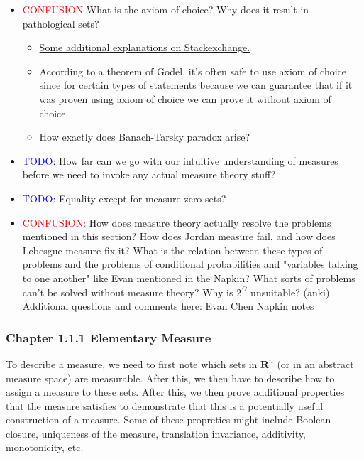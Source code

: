 \documentclass[answers,12pt]{exam}
\begin{document}
\begin{itemize}
    \item \textcolor{red}{CONFUSION} What is the axiom of choice? 
    Why does it result in pathological sets?
    \begin{itemize}
        \item \href{https://math.stackexchange.com/questions/132007/why-is-the-axiom-of-choice-separated-from-the-other-axioms}{Some additional explanations on Stackexchange.}
        \item According to a theorem of Godel, it's often safe to use axiom of choice since for certain types of statements because we can guarantee that if it was proven using axiom of choice we can prove it without axiom of choice.
        \item How exactly does Banach-Tarsky paradox arise?
    \end{itemize}
    \item \textcolor{blue}{TODO:} How far can we go with our intuitive understanding of measures before we need to invoke any actual measure theory stuff? 
    \item \textcolor{blue}{TODO:} Equality except for measure zero sets?
    \item \textcolor{red}{CONFUSION:} How does measure theory actually resolve the problems mentioned in this section? 
    How does Jordan measure fail, and how does Lebesgue measure fix it? 
    What is the relation between these types of problems and the problems of conditional probabilities and "variables talking to one another" like Evan mentioned in the Napkin? 
    What sorts of problems can't be solved without measure theory?
    Why is $2^{\Omega}$ unsuitable? (anki)
    Additional questions and comments here: \href{https://docs.google.com/document/d/1jym4JZ-bqRNGxGtEEVBKtedlWqwca3IJHacje2UngdQ/edit#}{Evan Chen Napkin notes}
\end{itemize}

\subsubsection{Chapter 1.1.1 Elementary Measure}
To describe a measure, we need to first note which sets in $\mathbf{R}^n$ (or in an abstract measure space) are measurable.
After this, we then have to describe how to assign a measure to these sets.
After this, we then prove additional properties that the measure satisfies to demonstrate that this is a potentially useful construction of a measure.
Some of these propreties might include Boolean closure, uniqueness of the measure, translation invariance, additivity, monotonicity, etc.
\end{document}
